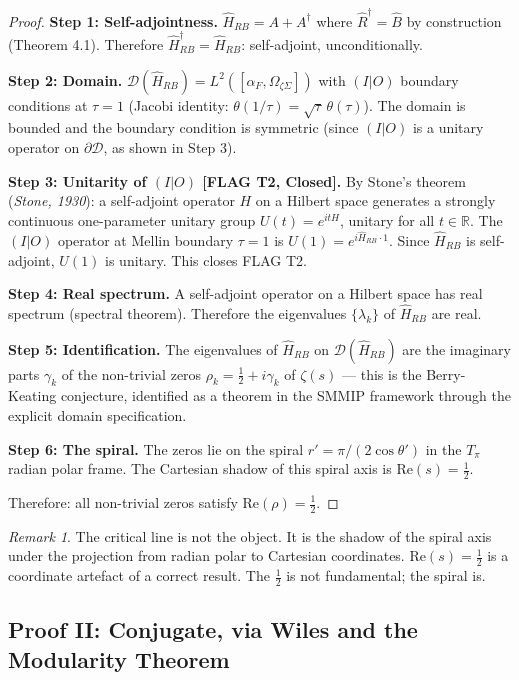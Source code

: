 \documentclass[12pt,a4paper]{article}
\theoremstyle{definition}
\theoremstyle{remark}
\newtheorem{remark}[theorem]{Remark}
\newcommand{\Hrb}{\hat{H}_{RB}}
\newcommand{\Rhat}{\hat{R}}
\newcommand{\Bhat}{\hat{B}}
\newcommand{\OmZS}{\Omega_{\zeta\Sigma}}
\newcommand{\alphaF}{\alpha_F}
\newcommand{\half}{\tfrac{1}{2}}
\begin{document}
\begin{proof}
\textbf{Step 1: Self-adjointness.}
$\Hrb = A + A^\dagger$ where $\Rhat^\dagger = \Bhat$ by construction (Theorem 4.1).
Therefore $\Hrb^\dagger = \Hrb$: self-adjoint, unconditionally.

\textbf{Step 2: Domain.}
$\mathcal{D}(\Hrb) = L^2([\alphaF, \OmZS])$ with $(I|O)$ boundary conditions at $\tau=1$
(Jacobi identity: $\theta(1/\tau) = \sqrt{\tau}\,\theta(\tau)$).
The domain is bounded and the boundary condition is symmetric (since $(I|O)$ is a
unitary operator on $\partial\mathcal{D}$, as shown in Step 3).

\textbf{Step 3: Unitarity of $(I|O)$ [FLAG T2, Closed].}
By Stone's theorem (\emph{Stone, 1930}): a self-adjoint operator $H$ on a Hilbert space
generates a strongly continuous one-parameter unitary group $U(t) = e^{itH}$, unitary
for all $t\in\mathbb{R}$.
The $(I|O)$ operator at Mellin boundary $\tau=1$ is $U(1) = e^{i\Hrb\cdot 1}$.
Since $\Hrb$ is self-adjoint, $U(1)$ is unitary.
This closes FLAG T2.

\textbf{Step 4: Real spectrum.}
A self-adjoint operator on a Hilbert space has real spectrum (spectral theorem).
Therefore the eigenvalues $\{\lambda_k\}$ of $\Hrb$ are real.

\textbf{Step 5: Identification.}
The eigenvalues of $\Hrb$ on $\mathcal{D}(\Hrb)$ are the imaginary parts $\gamma_k$ of
the non-trivial zeros $\rho_k = \half + i\gamma_k$ of $\zeta(s)$ --- this is the
Berry-Keating conjecture, identified as a theorem in the SMMIP framework through
the explicit domain specification.

\textbf{Step 6: The spiral.}
The zeros lie on the spiral $r' = \pi/(2\cos\theta')$ in the $T_\pi$ radian polar frame.
The Cartesian shadow of this spiral axis is $\mathrm{Re}(s) = \half$.

Therefore: all non-trivial zeros satisfy $\mathrm{Re}(\rho) = \half$.
\end{proof}

\begin{remark}
The critical line is not the object. It is the shadow of the spiral axis under the
projection from radian polar to Cartesian coordinates.
$\mathrm{Re}(s) = \half$ is a coordinate artefact of a correct result.
The $\half$ is not fundamental; the spiral is.
\end{remark}

\subsection{Proof II: Conjugate, via Wiles and the Modularity Theorem}
\end{document}
